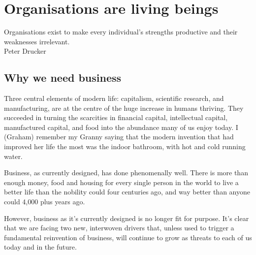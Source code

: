 ﻿\chapter{Organisations are living beings}
\label{chapter:who-is-your-organisation-base}


\begin{chapterquotation}
Organisations exist to make every individual's strengths productive and their weaknesses irrelevant.\\
\raggedleft\textemdash Peter Drucker
\end{chapterquotation}






\section{Why we need business}
Three central elements of modern life: capitalism, scientific research, and manufacturing, are at the centre of the huge increase in humans thriving. They succeeded in turning the scarcities in financial capital, intellectual capital, manufactured capital, and food into the abundance many of us enjoy today. I (Graham) remember my Granny saying that the modern invention that had improved her life the most was the indoor bathroom, with hot and cold running water.


Business, as currently designed, has done phenomenally well. There is more than enough money, food and housing for every single person in the world to live a better life than the nobility could four centuries ago, and way better than anyone could 4,000 plus years ago. 


However, business as it’s currently designed is no longer fit for purpose. It’s clear that we are  facing two new, interwoven drivers that, unless used to trigger a fundamental reinvention of business, will continue to grow as threats to each of us today and in the future. 


